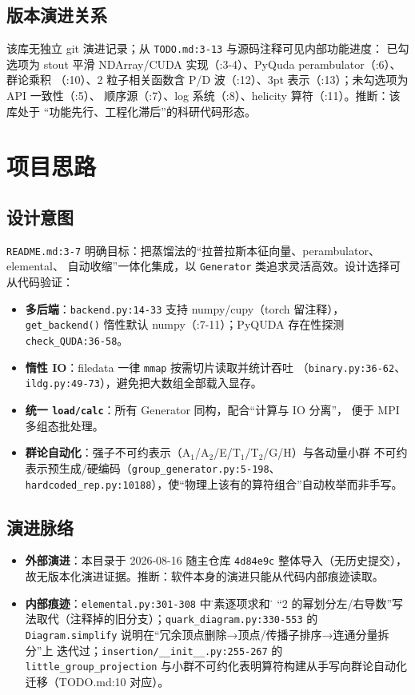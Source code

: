 \documentclass[UTF8]{ctexart}
\begin{document}
\subsection{版本演进关系}
该库无独立 git 演进记录；从 \texttt{TODO.md:3-13} 与源码注释可见内部功能进度：
已勾选项为 stout 平滑 NDArray/CUDA 实现（:3-4）、PyQuda perambulator（:6）、群论乘积
（:10）、2 粒子相关函数含 P/D 波（:12）、3pt 表示（:13）；未勾选项为 API 一致性（:5）、
顺序源（:7）、log 系统（:8）、helicity 算符（:11）。\textcolor{warn}{推断}：该库处于
``功能先行、工程化滞后''的科研代码形态。

\section{项目思路}

\subsection{设计意图}
\texttt{README.md:3-7} 明确目标：把蒸馏法的``拉普拉斯本征向量、perambulator、elemental、
自动收缩''一体化集成，以 \texttt{Generator} 类追求灵活高效。设计选择可从代码验证：
\begin{itemize}
\item \textbf{多后端}：\texttt{backend.py:14-33} 支持 numpy/cupy（torch 留注释），
\texttt{get\_backend()} 惰性默认 numpy（:7-11）；PyQUDA 存在性探测 \texttt{check\_QUDA:36-58}。
\item \textbf{惰性 IO}：filedata 一律 \texttt{mmap} 按需切片读取并统计吞吐
（\texttt{binary.py:36-62}、\texttt{ildg.py:49-73}），避免把大数组全部载入显存。
\item \textbf{统一 \texttt{load/calc}}：所有 Generator 同构，配合``计算与 IO 分离''，
便于 MPI 多组态批处理。
\item \textbf{群论自动化}：强子不可约表示（A$_1$/A$_2$/E/T$_1$/T$_2$/G/H）与各动量小群
不可约表示预生成/硬编码（\texttt{group\_generator.py:5-198}、
\texttt{hardcoded\_rep.py:10188}），使``物理上该有的算符组合''自动枚举而非手写。
\end{itemize}

\subsection{演进脉络}
\begin{itemize}
\item \textbf{外部演进}：本目录于 2026-08-16 随主仓库 \texttt{4d84e9c} 整体导入（无历史提交），
故无版本化演进证据。\textcolor{warn}{推断}：软件本身的演进只能从代码内部痕迹读取。
\item \textbf{内部痕迹}：\texttt{elemental.py:301-308} 中\"朴素逐项求和\"被
``2 的幂划分左/右导数''写法取代（注释掉的旧分支）；\texttt{quark\_diagram.py:330-553}
的 \texttt{Diagram.simplify} 说明在``冗余顶点删除→顶点/传播子排序→连通分量拆分''上
迭代过；\texttt{insertion/\_\_init\_\_.py:255-267} 的 \texttt{little\_group\_projection}
与小群不可约化表明算符构建从手写向群论自动化迁移（TODO.md:10 对应）。
\end{itemize}
\end{document}
